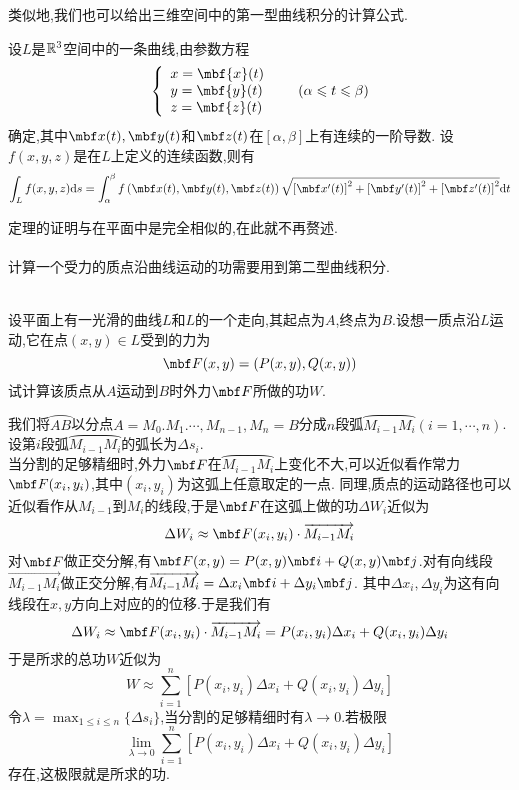 \documentclass{ctexart}
\begin{document}
类似地,我们也可以给出三维空间中的第一型曲线积分的计算公式.
\begin{formal}[1.6 空间第一型曲线积分的计算]
    设$L$是$\mathbb{R}^3$空间中的一条曲线,由参数方程
    \[\left\{\begin{array}{l}
        x=\mbf{x}(t)\\y=\mbf{y}(t)\\z=\mbf{z}(t)
    \end{array}\right.\ \ \ \ \ (\alpha\leqslant t\leqslant\beta)\]
    确定,其中$\mbf x(t),\mbf y(t)$和$\mbf z(t)$在$[\alpha,\beta]$上有连续的一阶导数.%
    设$f(x,y,z)$是在$L$上定义的连续函数,则有
    \[\int_{L}f(x,y,z)\di s=\int_{\alpha}^{\beta}f\left(\mbf x(t),\mbf y(t),\mbf z(t)\right)\sqrt{\left[\mbf x'(t)\right]^2+\left[\mbf y'(t)\right]^2+\left[\mbf z'(t)\right]^2}\di t\]
\end{formal}\noindent
定理的证明与在平面中是完全相似的,在此就不再赘述.\\
\\
计算一个受力的质点沿曲线运动的功需要用到第二型曲线积分.
\begin{problem}[2.1 质点沿曲线运动所做的功]
    \\设平面上有一光滑的曲线$L$和$L$的一个走向,其起点为$A$,终点为$B$.设想一质点沿$L$运动,它在点$(x,y)\in L$受到的力为
    \[\mbf F(x,y)=\left(P(x,y),Q(x,y)\right)\]
    试计算该质点从$A$运动到$B$时外力$\mbf F$所做的功$W$.
\end{problem}
\begin{solution}
    我们将$\wideparen{AB}$以分点$A=M_0.M_1.\cdots,M_{n-1},M_n=B$分成$n$段弧$\wideparen{M_{i-1}M_{i}}(i=1,\cdots,n)$.\\
    设第$i$段弧$\wideparen{M_{i-1}M_{i}}$的弧长为$\Delta s_i$.\\
    当分割的足够精细时,外力$\mbf F$在$\wideparen{M_{i-1}M_{i}}$上变化不大,可以近似看作常力$\mbf F(x_i,y_i)$,其中$(x_i,y_i)$为这弧上任意取定的一点.%
    同理,质点的运动路径也可以近似看作从$M_{i-1}$到$M_i$的线段,于是$\mbf F$在这弧上做的功$\Delta W_i$近似为
    \[\Delta W_i\approx \mbf F(x_i,y_i)\cdot\overrightarrow{M_{i-1}M_i}\]
    对$\mbf F$做正交分解,有$\mbf F(x,y)=P(x,y)\mbf i+Q(x,y)\mbf j$.对有向线段$\overrightarrow{M_{i-1}M_{i}}$做正交分解,有$\overrightarrow{M_{i-1}M_i}=\Delta x_i\mbf i+\Delta y_i\mbf j$.%
    其中$\Delta x_i,\Delta y_i$为这有向线段在$x,y$方向上对应的的位移.于是我们有
    \[\Delta W_i\approx \mbf F(x_i,y_i)\cdot\overrightarrow{M_{i-1}M_i}=P(x_i,y_i)\Delta x_i+Q(x_i,y_i)\Delta y_i\]
    于是所求的总功$W$近似为
    \[W\approx\sum_{i=1}^{n}\left[P(x_i,y_i)\Delta x_i+Q(x_i,y_i)\Delta y_i\right]\]
    令$\displaystyle\lambda=\max_{1\leqslant i\leqslant n}\{\Delta s_i\}$,当分割的足够精细时有$\lambda\to0$.若极限
    \[\lim_{\lambda\to0}\sum_{i=1}^{n}\left[P(x_i,y_i)\Delta x_i+Q(x_i,y_i)\Delta y_i\right]\]
    存在,这极限就是所求的功.
\end{solution}\noindent
\end{document}
